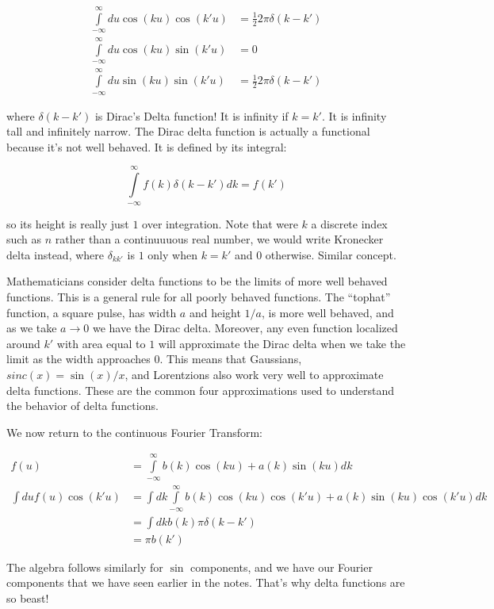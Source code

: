 \documentclass{report}
\begin{document}
\begin{align*}
\displaystyle\int\limits_{-\infty}^{\infty}{du\cos(ku)\cos(k'u)} &= \frac{1}{2} 2\pi \delta(k - k')\\
\displaystyle\int\limits_{-\infty}^{\infty}{du\cos(ku)\sin(k'u)} &= 0\\
\displaystyle\int\limits_{-\infty}^{\infty}{du\sin(ku)\sin(k'u)} &= \frac{1}{2} 2\pi \delta(k - k')
\end{align*}

where $\delta(k-k')$ is Dirac's Delta function! It is infinity if $k = k'$. It is infinity tall and infinitely narrow. The Dirac delta function is actually a functional because it's not well behaved. It is defined by its integral:

$$\displaystyle\int\limits_{-\infty}^{\infty} f(k) \delta(k - k') dk = f(k')$$

so its height is really just $1$ over integration. Note that were $k$ a discrete index such as $n$ rather than a continuuuous real number, we would write Kronecker delta instead, where $\delta_{kk'}$ is $1$ only when $k = k'$ and $0$ otherwise. Similar concept.

Mathematicians consider delta functions to be the limits of more well behaved functions. This is a general rule for all poorly behaved functions. The ``tophat'' function, a square pulse, has width $a$ and height $1/a$, is more well behaved, and as we take $a \to 0$ we have the Dirac delta. Moreover, any even function localized around $k'$ with area equal to $1$ will approximate the Dirac delta when we take the limit as the width approaches $0$. This means that Gaussians, $sinc(x) = \sin(x)/x$, and Lorentzions also work very well to approximate delta functions. These are the common four approximations used to understand the behavior of delta functions.

We now return to the continuous Fourier Transform:

\begin{align*}
f(u) &= \displaystyle\int\limits_{-\infty}^{\infty}{b(k)\cos(ku) + a(k)\sin(ku)dk}\\
\int{du f(u)\cos(k'u)} &= \int{dk \displaystyle\int\limits_{-\infty}^{\infty}{b(k)\cos(ku)\cos(k'u) + a(k)\sin(ku)\cos(k'u)dk}}\\
&= \int{dk b(k)\pi\delta(k-k')}\\
&= \pi b(k')
\end{align*}

The algebra follows similarly for $\sin$ components, and we have our Fourier components that we have seen earlier in the notes. That's why delta functions are so beast!
\end{document}
